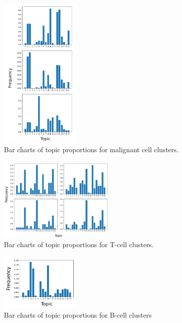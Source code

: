 \documentclass{article}
\begin{document}
\begin{figure}
    \centering
    \includegraphics[width=0.35\textwidth]{figs/tumortopics}
    \caption{Bar charts of topic proportions for malignant cell clusters.}
    \label{fig:tumortopics}
\end{figure}
\begin{figure}
    \centering
    \includegraphics[width=0.5\textwidth]{figs/tcelltopics}
    \caption{Bar charts of topic proportions for T-cell clusters.}
    \label{fig:tcelltopics}
\end{figure}
\begin{figure}
    \centering
    \includegraphics[width=0.35\textwidth]{figs/bcelltopics}
    \caption{Bar charts of topic proportions for B-cell clusters}
    \label{fig:bcelltopics}
\end{figure}
\end{document}
